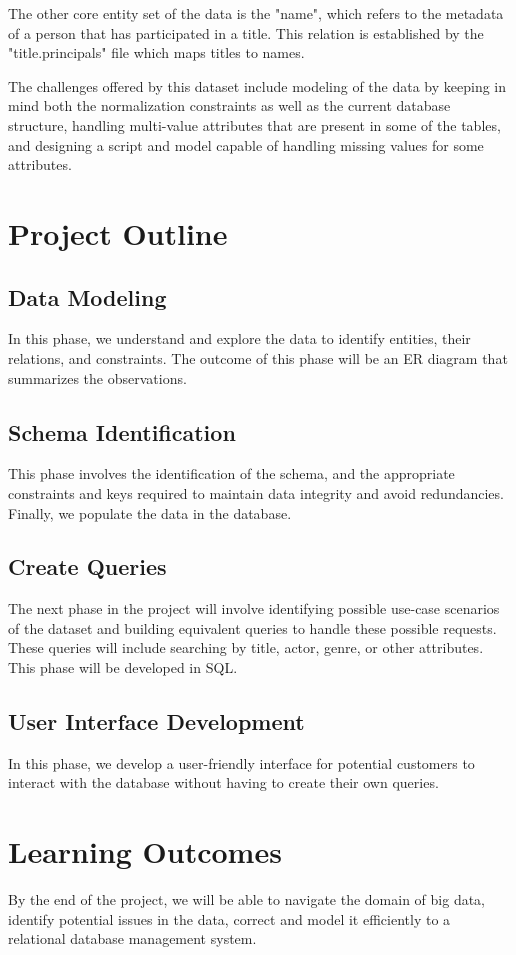 \documentclass{sig-alternate}
\begin{document}
The other core entity set of the data is the "name", which refers to the metadata of a person that has participated in a title. This relation is established by the "title.principals" file which maps titles to names.

The challenges offered by this dataset include modeling of the data by keeping in mind both the normalization constraints as well as the current database structure, handling multi-value attributes that are present in some of the tables, and designing a script and model capable of handling missing values for some attributes.
\section{Project Outline}
\subsection{Data Modeling}
In this phase, we understand and explore the data to identify entities, their relations, and constraints. The outcome of this phase will be an  ER diagram that summarizes the observations.
\subsection{Schema Identification}
This phase involves the identification of the schema, and the appropriate constraints and keys required to maintain data integrity and avoid redundancies. Finally, we populate the data in the database.
\subsection{Create Queries}
The next phase in the project will involve identifying possible use-case scenarios of the dataset and building equivalent queries to handle these possible requests. These queries will include searching by title, actor, genre, or other attributes. This phase will be developed in SQL. 
\subsection{User Interface Development}
In this phase, we develop a user-friendly interface for potential customers to interact with the database without having to create their own queries. 
\section{Learning Outcomes}
By the end of the project, we will be able to navigate the domain of big data, identify potential issues in the data, correct and model it efficiently to a relational database management system. 
\end{document}
